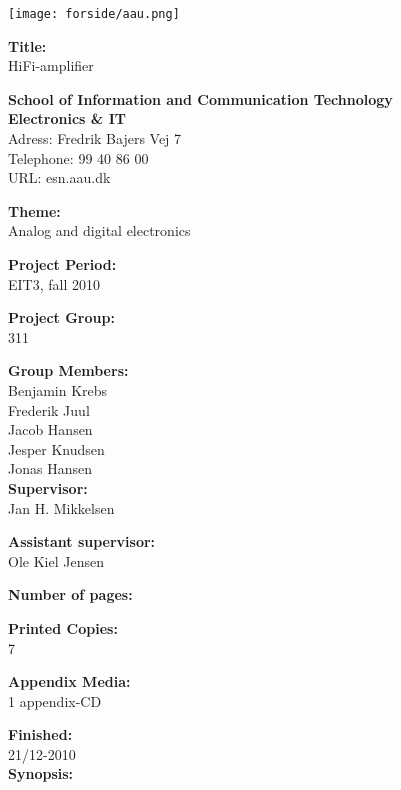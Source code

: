 \begin{multicols}{2}
\texttt{[image: forside/aau.png]}

\small{\textbf{Title:\\}
HiFi-amplifier}

\scriptsize{\textbf{School of Information and Communication Technology\\ Electronics \& IT\\}
Adress: Fredrik Bajers Vej 7\\
Telephone: 99 40 86 00\\
URL: esn.aau.dk \\}
\end{multicols}
\begin{multicols}{2}

\small{\textbf{Theme:\\}
Analog and digital electronics

\textbf{Project Period:\\}
EIT3, fall 2010

\textbf{Project Group:\\}
311

\textbf{Group Members:\\}
Benjamin Krebs\\
Frederik Juul\\
Jacob Hansen\\
Jesper Knudsen\\
Jonas Hansen\\

\textbf{Supervisor:\\}
Jan H. Mikkelsen

\textbf{Assistant supervisor:\\}
Ole Kiel Jensen

\textbf{Number of pages:\\}
\pageref{LastPage}

\textbf{Printed Copies:\\}
7

\textbf{Appendix Media:\\}
1 appendix-CD

\textbf{Finished:\\}
21/12-2010
\\
\textbf{Synopsis:}}

\end{multicols}
